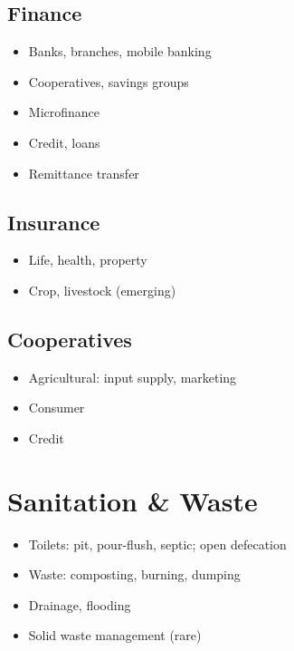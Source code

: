\documentclass[11pt,a4paper]{article}
\begin{document}
\subsection{Finance}
\begin{itemize}
    \item Banks, branches, mobile banking
    \item Cooperatives, savings groups
    \item Microfinance
    \item Credit, loans
    \item Remittance transfer
\end{itemize}

\subsection{Insurance}
\begin{itemize}
    \item Life, health, property
    \item Crop, livestock (emerging)
\end{itemize}

\subsection{Cooperatives}
\begin{itemize}
    \item Agricultural: input supply, marketing
    \item Consumer
    \item Credit
\end{itemize}

\section{Sanitation \& Waste}

\begin{itemize}
    \item Toilets: pit, pour-flush, septic; open defecation
    \item Waste: composting, burning, dumping
    \item Drainage, flooding
    \item Solid waste management (rare)
\end{itemize}

\end{document}
